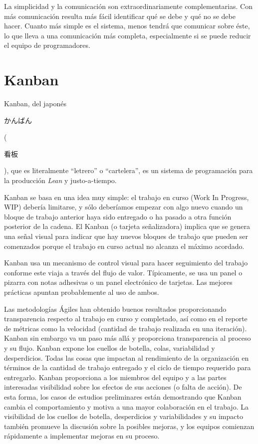 La simplicidad y la comunicación son extraordinariamente complementarias. Con más comunicación resulta más fácil identificar qué se debe y qué no se debe hacer. Cuanto más simple es el sistema, menos tendrá que comunicar sobre éste, lo que lleva a una comunicación más completa, especialmente si se puede reducir el equipo de programadores.

\section{Kanban}

Kanban, del japonés \begin{CJK*}{UTF8}{gbsn}かんばん\end{CJK*}(\begin{CJK*}{UTF8}{gbsn}看板\end{CJK*}), que es literalmente ``letrero'' o ``cartelera'', es un sistema de programación para la producción \textit{Lean} y justo-a-tiempo.

Kanban se basa en una idea muy simple: el trabajo en curso (Work In Progress, WIP) debería limitarse, y sólo deberíamos empezar con algo nuevo cuando un bloque de trabajo anterior haya sido entregado o ha pasado a otra función posterior de la cadena. El Kanban (o tarjeta señalizadora) implica que se genera una señal visual para indicar que hay nuevos bloques de trabajo que pueden ser comenzados porque el trabajo en curso actual no alcanza el máximo acordado.

Kanban usa un mecanismo de control visual para hacer seguimiento del trabajo conforme este viaja a través del flujo de valor. Típicamente, se usa un panel o pizarra con notas adhesivas o un panel electrónico de tarjetas. Las mejores prácticas apuntan probablemente al uso de ambos.

Las metodologías Ágiles han obtenido buenos resultados proporcionando transparencia respecto al trabajo en curso y completado, así como en el reporte de métricas como la velocidad (cantidad de trabajo realizada en una iteración). Kanban sin embargo va un paso más allá y proporciona transparencia al proceso y su flujo. Kanban expone los cuellos de botella, colas, variabilidad y desperdicios. Todas las cosas que impactan al rendimiento de la organización en términos de la cantidad de trabajo entregado y el ciclo de tiempo requerido para entregarlo. Kanban proporciona a los miembros del equipo y a las partes interesadas visibilidad sobre los efectos de sus acciones (o falta de acción). De esta forma, los casos de estudios preliminares están demostrando que Kanban cambia el comportamiento y motiva a una mayor colaboración en el trabajo. La visibilidad de los cuellos de botella, desperdicios y variabilidades y su impacto también promueve la discusión sobre la posibles mejoras, y los equipos comienzan rápidamente a implementar mejoras en su proceso.\cite{Skarin201003}

